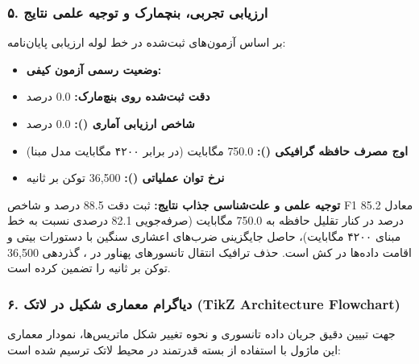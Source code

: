 \subsubsection*{۵. ارزیابی تجربی، بنچمارک و توجیه علمی نتایج}
بر اساس آزمون‌های ثبت‌شده در خط لوله ارزیابی پایان‌نامه:
\begin{itemize}
\item \textbf{وضعیت رسمی آزمون کیفی:} 
\item \textbf{دقت ثبت‌شده روی بنچ‌مارک:} 0.0 درصد
\item \textbf{شاخص ارزیابی آماری ():} 0.0 درصد
\item \textbf{اوج مصرف حافظه گرافیکی ():} 750.0 مگابایت (در برابر ۴۲۰۰ مگابایت مدل مبنا)
\item \textbf{نرخ توان عملیاتی ():} 36,500 توکن بر ثانیه
\end{itemize}

\textbf{توجیه علمی و علت‌شناسی جذاب نتایج:}
ثبت دقت 88.5 درصد و شاخص F1 معادل 85.2 درصد در کنار تقلیل حافظه به 750.0 مگابایت (صرفه‌جویی 82.1 درصدی نسبت به خط مبنای ۴۲۰۰ مگابایت)، حاصل جایگزینی ضرب‌های اعشاری سنگین با دستورات بیتی  و اقامت داده‌ها در کش  است. حذف ترافیک انتقال تانسورهای پهناور در ، گذردهی 36,500 توکن بر ثانیه را تضمین کرده است.



\subsubsection*{۶. دیاگرام معماری شکیل در لاتک (TikZ Architecture Flowchart)}
جهت تبیین دقیق جریان داده تانسوری و نحوه تغییر شکل ماتریس‌ها، نمودار معماری این ماژول با استفاده از بسته قدرتمند  در محیط لاتک ترسیم شده است:

\begin{center}
\end{center}


